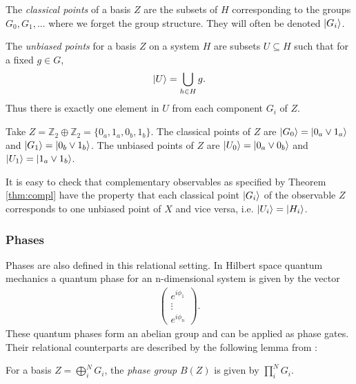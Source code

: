 \begin{corollary}
The \emph{classical points} of a basis $Z$ are the subsets of $H$ corresponding to the groups $G_0, G_1,...$ where we forget the group structure. They will often be denoted $| G_i \rangle$.
\end{corollary}

\begin{corollary}
The \emph{unbiased points} for a basis $Z$ on a system $H$ are subsets $U\subseteq H$ such that for a fixed $g\in G$,
\begin{align*}
| U \rangle = \bigcup_{h\in H}g .
\end{align*}
Thus there is exactly one element in $U$ from each component $G_i$ of $Z$.
\end{corollary}

\begin{example}
Take $Z = \mathbb{Z}_2\oplus\mathbb{Z}_2=\{0_a,1_a,0_b,1_b\}$. The classical points of $Z$ are $| G_0 \rangle=| 0_a\vee1_a \rangle$ and $| G_1 \rangle=| 0_b\vee1_b \rangle$.  The unbiased points of $Z$ are $| U_0 \rangle=| 0_a\vee0_b \rangle$ and $| U_1 \rangle=| 1_a\vee1_b \rangle$.
\end{example}

It is easy to check that complementary observables as specified by Theorem \ref{thm:compl} have the property that each classical point $| G_i \rangle$ of the observable $Z$ corresponds to one unbiased point of $X$ and vice versa, i.e. $| U_i \rangle=| H_i \rangle$.

\subsubsection*{Phases}

Phases are also defined in this relational setting.  In Hilbert space quantum mechanics a quantum phase for an n-dimensional system is given by the vector
\begin{align*}
\left(\begin{array}{c}
e^{i\phi_1} \\
\vdots \\
e^{i\phi_n}
\end{array}
\right).
\end{align*}
These quantum phases form an abelian group and can be applied as phase gates.
Their relational counterparts are described by the following lemma from \cite{cqm-notes}:
\begin{lemma}
For a basis $Z=\bigoplus_i^NG_i$, the \emph{phase group} $B(Z)$ is given by $\prod_i^NG_i$.
\end{lemma}

